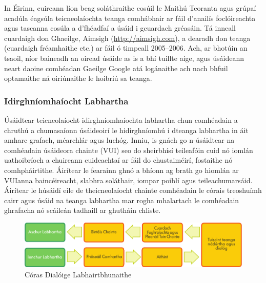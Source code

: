 \begin{multicols}{2}
 In Éirinn, cuireann líon beag soláthraithe cosúil le Maithú Teoranta agus grúpaí acadúla éagsúla teicneolaíochta teanga comhábhair ar fáil d’anailís foclóireachta agus tascanna cosúla a d’fhéadfaí a úsáid i gcuardach gréasáin. Tá inneall cuardaigh don Ghaeilge, Aimsigh (\url{http://aimsigh.com}), a dearadh don teanga (cuardaigh fréamhaithe etc.) ar fáil ó timpeall 2005--2006. Ach, ar bhotúin an tsaoil, níor baineadh an oiread úsáide as is a bhí tuillte aige, agus úsáideann neart daoine comhéadan Gaeilge Google atá logánaithe ach nach bhfuil optamaithe ná oiriúnaithe le hoibriú sa teanga.
  
\subsubsection{Idirghníomhaíocht Labhartha}

Úsáidtear teicneolaíocht idirghníomhaíochta labhartha chun comhéadain a chruthú a chumasaíonn úsáideoirí le hidirghníomhú i dteanga labhartha in áit amharc grafach, méarchlár agus luchóg. Inniu, is gnách go n-úsáidtear na comhéadain úsáideora chainte (VUI) seo do sheirbhísí teileafóin cuid nó iomlán uathoibríoch a chuireann cuideachtaí ar fáil do chustaiméirí, fostaithe nó comhpháirtithe. Áirítear le fearainn ghnó a bhíonn ag brath go hiomlán ar VUIanna baincéireacht, slabhra soláthair, iompar poiblí agus teileachumarsáid. Áirítear le húsáidí eile de theicneolaíocht chainte comhéadain le córais treoshuímh cairr agus úsáid na teanga labhartha mar rogha mhalartach le comhéadain ghrafacha nó scáileán tadhaill ar ghutháin chliste.


\begin{figure}[htb]
  \center 
  \includegraphics[width=\textwidth]{../_media/irish/simple_speech-based_dialogue_architecture}
  \caption{Córas Dialóige Labhairtbhunaithe}
  \label{fig:dialoguearch_de}
\end{figure}


\end{multicols}

